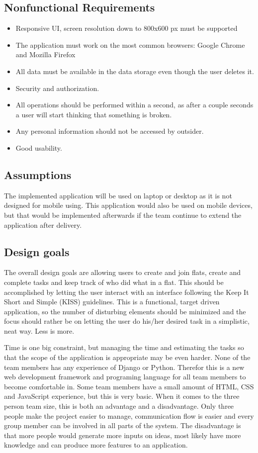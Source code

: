 \documentclass{sig-alt-release2}
\begin{document}
\subsection{Nonfunctional Requirements}
\begin{itemize}
\item Responsive UI, screen resolution down to 800x600 px must be supported
\item The application must work on the most common browsers: Google Chrome and Mozilla Firefox 
\item All data must be available in the data storage even though the user deletes it.
\item Security and authorization.
\item All operations should be performed within a second, as after a couple seconds a user will start thinking that something is broken.
\item Any personal information should not be accessed by outsider.
\item Good usability.
\end{itemize}

\subsection{Assumptions}

The implemented application will be used on laptop or desktop as it is not designed for mobile using. This application would also be used on mobile devices, but that would be implemented afterwards if the team continue to extend the application after delivery. 

\subsection{Design goals}

The overall design goals are allowing users to create and join flats, create and
complete tasks and keep track of who did what in a flat. This should be
accomplished by letting the user interact with an interface following the Keep
It Short and Simple (KISS) guidelines. This is a functional, target driven
application, so the number of disturbing elements should be minimized and the
focus should rather be on letting the user do his/her desired task in a
simplistic, neat way. Less is more.

Time is one big constraint, but managing the time and estimating the tasks so
that the scope of the application is appropriate may be even harder. None of the
team members has any experience of Django or Python. Therefor this is a new web
development framework and programing language for all team members to become
comfortable in. Some team members have a small amount of HTML, CSS and
JavaScript experience, but this is very basic. When it comes to the three person
team size, this is both an advantage and a disadvantage. Only three people make
the project easier to manage, communication flow is easier and every group
member can be involved in all parts of the system. The disadvantage is that more
people would generate more inputs on ideas, most likely have more knowledge and
can produce more features to an application.
\end{document}
